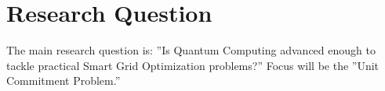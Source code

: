 \section{Research Question}

The main research question is:
''Is Quantum Computing advanced enough to tackle practical
Smart Grid Optimization problems?''
Focus will be the ''Unit Commitment Problem.''